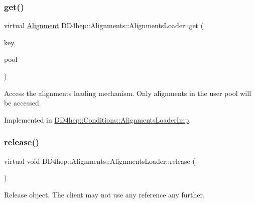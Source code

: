 \subsubsection{\texorpdfstring{get()}{get()}\hspace{0.1cm}{\footnotesize\ttfamily [2/2]}}
{\footnotesize\ttfamily virtual \hyperlink{class_d_d4hep_1_1_alignments_1_1_alignment}{Alignment} D\+D4hep\+::\+Alignments\+::\+Alignments\+Loader\+::get (\begin{DoxyParamCaption}\item[{\hyperlink{class_d_d4hep_1_1_alignments_1_1_alignments_loader_af56e6294e72dacbe001c1f24b8381d5d}{key\+\_\+type}}]{key,  }\item[{const \hyperlink{class_d_d4hep_1_1_conditions_1_1_user_pool}{User\+Pool} \&}]{pool }\end{DoxyParamCaption})\hspace{0.3cm}{\ttfamily [pure virtual]}}



Access the alignments loading mechanism. Only alignments in the user pool will be accessed. 



Implemented in \hyperlink{class_d_d4hep_1_1_conditions_1_1_alignments_loader_imp_ab37a7e41559862d5c424fcad50bb6768}{D\+D4hep\+::\+Conditions\+::\+Alignments\+Loader\+Imp}.

\hypertarget{class_d_d4hep_1_1_alignments_1_1_alignments_loader_acebda57b7dc5288116e7162dda92b65e}{}\label{class_d_d4hep_1_1_alignments_1_1_alignments_loader_acebda57b7dc5288116e7162dda92b65e} 
\subsubsection{\texorpdfstring{release()}{release()}}
{\footnotesize\ttfamily virtual void D\+D4hep\+::\+Alignments\+::\+Alignments\+Loader\+::release (\begin{DoxyParamCaption}{ }\end{DoxyParamCaption})\hspace{0.3cm}{\ttfamily [pure virtual]}}



Release object. The client may not use any reference any further. 




